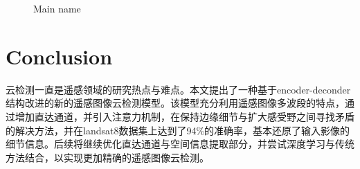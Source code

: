 \documentclass[UTF8]{ctexart}
\begin{document}
\begin{figure}[H]

    \caption{Main name}
    \label{Fig.main}
\end{figure}


\section[]{Conclusion}
云检测一直是遥感领域的研究热点与难点。本文提出了一种基于encoder-deconder结构改进的新的遥感图像云检测模型。该模型充分利用遥感图像多波段的特点，通过增加直达通道，并引入注意力机制，在保持边缘细节与扩大感受野之间寻找矛盾的解决方法，并在landsat8数据集上达到了94\%的准确率，基本还原了输入影像的细节信息。后续将继续优化直达通道与空间信息提取部分，并尝试深度学习与传统方法结合，以实现更加精确的遥感图像云检测。

\end{document}
